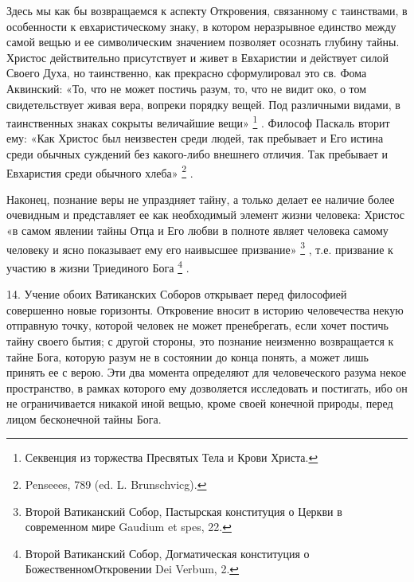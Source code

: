 \documentclass[a5paper,10pt]{article}
\begin{document}
Здесь мы как бы возвращаемся к аспекту Откровения, связанному с таинствами, в
особенности к евхаристическому знаку, в котором неразрывное единство между
самой вещью и ее символическим значением позволяет осознать глубину тайны.
Христос действительно присутствует и живет в Евхаристии и действует силой
Своего Духа, но таинственно, как прекрасно сформулировал это св. Фома
Аквинский: «То, что не может постичь разум, то, что не видит око, о том
свидетельствует живая вера, вопреки порядку вещей. Под различными видами, в
таинственных знаках сокрыты величайшие вещи» \footnote{Секвенция из торжества
Пресвятых Тела и Крови Христа.} . Философ Паскаль вторит ему: «Как Христос был
неизвестен среди людей, так пребывает и Его истина среди обычных суждений без
какого-либо внешнего отличия. Так пребывает и Евхаристия среди обычного хлеба»
\footnote{Penseees, 789 (ed. L. Brunschvicg).} .

Наконец, познание веры не упраздняет тайну, а только делает ее наличие более
очевидным и представляет ее как необходимый элемент жизни человека: Христос «в
самом явлении тайны Отца и Его любви в полноте являет человека самому человеку
и ясно показывает ему его наивысшее призвание» \footnote{Второй Ватиканский
Собор, Пастырская конституция о Церкви в современном мире Gaudium et spes, 22.}
, т.е. призвание к участию в жизни Триединого Бога \footnote{Второй Ватиканский
Собор, Догматическая конституция о БожественномОткровении Dei Verbum, 2.} .

14. Учение обоих Ватиканских Соборов открывает перед философией совершенно
новые горизонты. Откровение вносит в историю человечества некую отправную
точку, которой человек не может пренебрегать, если хочет постичь тайну своего
бытия; с другой стороны, это познание неизменно возвращается к тайне Бога,
которую разум не в состоянии до конца понять, а может лишь принять ее с верою.
Эти два момента определяют для человеческого разума некое пространство, в
рамках которого ему дозволяется исследовать и постигать, ибо он не
ограничивается никакой иной вещью, кроме своей конечной природы, перед лицом
бесконечной тайны Бога.
\end{document}
